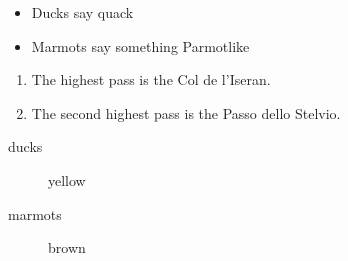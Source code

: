 \documentclass{scrbook}
\begin{document}
\pagestyle{empty}\renewcommand{}



\begin{itemize}
\item Ducks say quack
\item Marmots say something Parmotlike
\end{itemize}

\begin{enumerate}
\item The highest pass is the Col de l'Iseran.
\item The second highest pass is the Passo dello Stelvio.
\end{enumerate}

\begin{description}
\item[ducks] yellow
\item[marmots] brown
\end{description}
\end{document}
